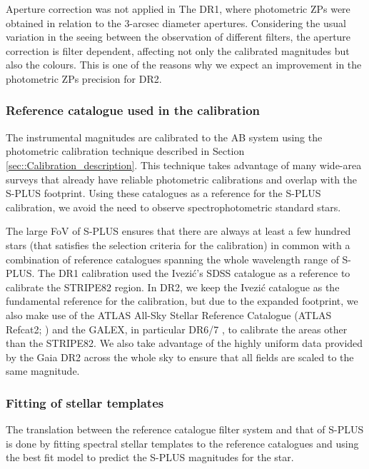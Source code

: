 \documentclass[fleqn,usenatbib]{mnras}
\begin{document}
Aperture correction was not applied in The DR1, where photometric ZPs were obtained in relation to the 3-arcsec diameter apertures. Considering the usual variation in the seeing between the observation of different filters, the aperture correction is filter dependent, affecting not only the calibrated magnitudes but also the colours. This is one of the reasons why we expect an improvement in the photometric ZPs precision for DR2.

\subsubsection{Reference catalogue used in the calibration}

The instrumental magnitudes are calibrated to the AB system using the photometric calibration technique described in Section \ref{sec::Calibration_description}. This technique takes advantage of many wide-area surveys that already have reliable photometric calibrations and overlap with the S-PLUS footprint. Using these catalogues as a reference for the S-PLUS calibration, we avoid the need to observe spectrophotometric standard stars.

The large FoV of S-PLUS ensures that there are always at least a few hundred stars (that satisfies the selection criteria for the calibration) in common with a combination of reference catalogues spanning the whole wavelength range of S-PLUS. The DR1 calibration used the Ivezi{\'c}'s SDSS \citep{Ivezic+2007} catalogue as a reference to calibrate the STRIPE82 region. In DR2, we keep the Ivezi{\'c} catalogue as the fundamental reference for the calibration, but due to the expanded footprint, we also make use of the ATLAS All-Sky Stellar Reference Catalogue (ATLAS Refcat2; \citealp{Tonry+2018}) and the GALEX, in particular DR6/7 \citep{Bianchi+2014}, to calibrate the areas other than the STRIPE82. We also take advantage of the highly uniform data provided by the Gaia DR2 \citep{GaiaCollaboration+2018} across the whole sky to ensure that all fields are scaled to the same magnitude.



\subsubsection{Fitting of stellar templates}

The translation between the reference catalogue filter system and that of S-PLUS is done by fitting spectral stellar templates to the reference catalogues and using the best fit model to predict the S-PLUS magnitudes for the star.
\end{document}
